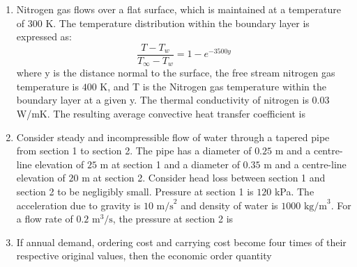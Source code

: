 \documentclass[journal,12pt,onecolumn]{IEEEtran}
\theoremstyle{remark}
\begin{document}
\begin{enumerate}
\item Nitrogen gas flows over a flat surface, which is maintained at a temperature  of $300$ K. The temperature distribution within the boundary layer is expressed as:
$$ \frac{T - T_w}{T_{\infty} - T_w} = 1 - e^{-3500y} $$
where y  is the distance normal to the surface, the free stream nitrogen gas temperature  is $400$ K, and T is the Nitrogen gas temperature within the boundary layer at a given y. The thermal conductivity of nitrogen is $0.03$ W/mK. The resulting average convective heat transfer coefficient  is
\hfill{}
\begin{enumerate}
\end{enumerate}

\item Consider steady and incompressible flow of water through a tapered pipe from section 1 to section 2. The pipe has a diameter of $0.25$ m and a centre-line elevation of $25$ m at section 1 and a diameter of $0.35$ m and a centre-line elevation of $20$ m at section 2. Consider head loss between section 1 and section 2 to be negligibly small. Pressure at section 1 is $120$ kPa. The acceleration due to gravity is $10 \text{ m/s}^2$ and density of water is $1000 \text{ kg/m}^3$. For a flow rate of $0.2 \text{ m}^3\text{/s}$, the pressure at section 2  is
\hfill{}
\begin{enumerate}
\end{enumerate}

\item If annual demand, ordering cost and carrying cost become four times of their respective original values, then the economic order quantity 
\hfill{}
\begin{enumerate}
\end{enumerate}


\end{enumerate}
\end{document}
